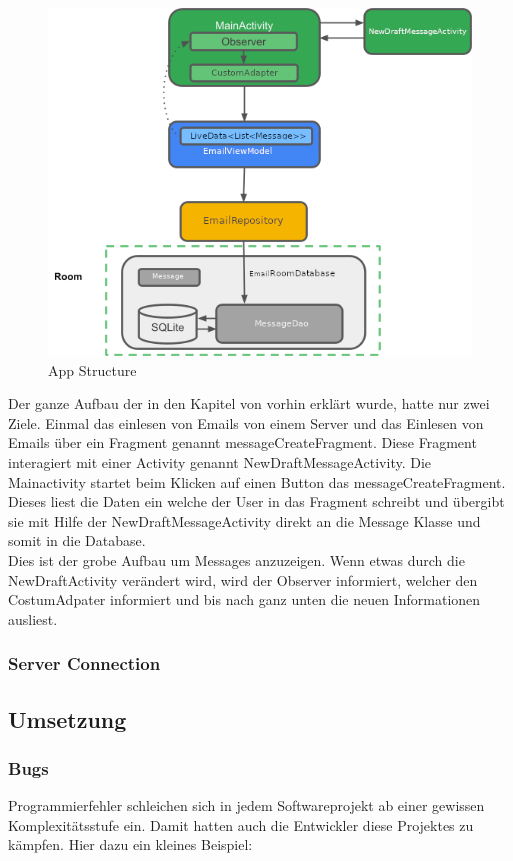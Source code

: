 \documentclass[a4paper,11pt]{article}
\begin{document}
\begin{figure}
    \centering
    \includegraphics[width=.55\textwidth, height=.55\textwidth]{media/AppStructure.png}
    \caption{App Structure \cite{appStructurePicture}}
\end{figure}

Der ganze Aufbau der in den Kapitel von vorhin erklärt wurde, hatte nur zwei Ziele. Einmal das einlesen von Emails von einem Server und das Einlesen von Emails
über ein Fragment genannt messageCreateFragment. Diese Fragment interagiert mit einer Activity genannt NewDraftMessageActivity. Die Mainactivity startet beim Klicken auf einen Button 
das messageCreateFragment. Dieses liest die Daten ein welche der User in das Fragment schreibt und übergibt sie mit Hilfe der NewDraftMessageActivity direkt an die Message Klasse und somit in die 
Database.  \\

Dies ist der grobe Aufbau um Messages anzuzeigen. Wenn etwas durch die NewDraftActivity verändert wird, wird der Observer informiert, welcher den CostumAdpater informiert und bis nach 
ganz unten die neuen Informationen ausliest.

\subsubsection{Server Connection}

\subsection{Umsetzung}
\subsubsection{Bugs}
Programmierfehler schleichen sich in jedem Softwareprojekt ab einer gewissen Komplexitätsstufe ein. Damit hatten auch die Entwickler diese Projektes zu kämpfen. Hier dazu ein kleines Beispiel:
\end{document}
